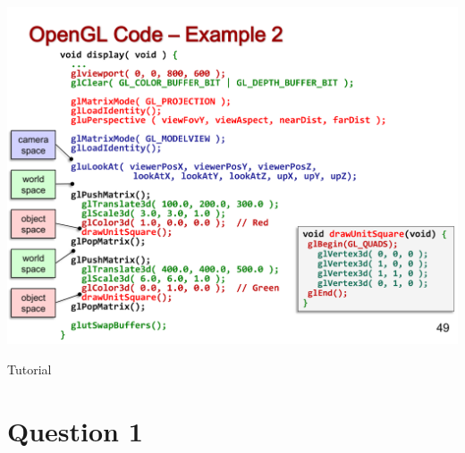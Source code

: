 \documentclass{beamer}
\begin{document}
\begin{frame}
    \centering
    \includegraphics[scale=0.4]{pg49.png}
\end{frame}

\begin{frame}
    \AlegreyaExtraBold \LARGE
    Tutorial
\end{frame}

\section{Question 1}
\end{document}
